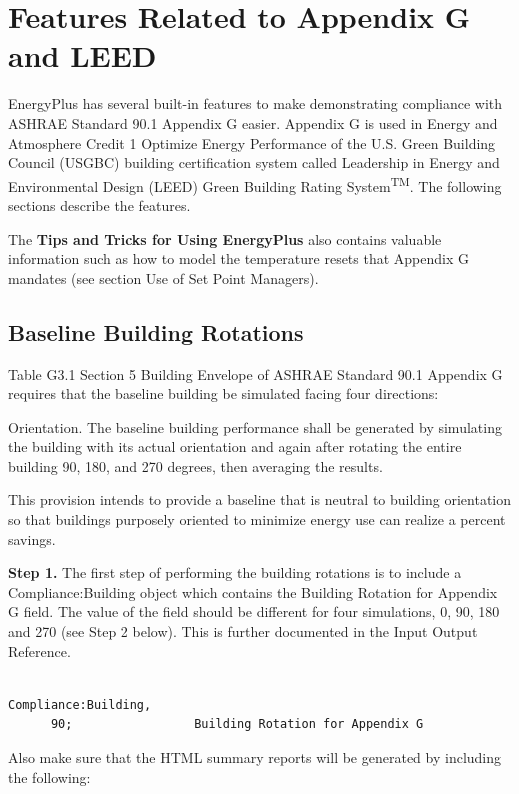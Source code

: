 \section{Features Related to Appendix G and LEED}\label{features-related-to-appendix-g-and-leed}

EnergyPlus has several built-in features to make demonstrating compliance with ASHRAE Standard 90.1 Appendix G easier. Appendix G is used in Energy and Atmosphere Credit 1 Optimize Energy Performance of the U.S. Green Building Council (USGBC) building certification system called Leadership in Energy and Environmental Design (LEED) Green Building Rating System\textsuperscript{TM}. The following sections describe the features.

The \textbf{Tips and Tricks for Using EnergyPlus} also contains valuable information such as how to model the temperature resets that Appendix G mandates (see section Use of Set Point Managers).

\subsection{Baseline Building Rotations}\label{baseline-building-rotations}

Table G3.1 Section 5 Building Envelope of ASHRAE Standard 90.1 Appendix G requires that the baseline building be simulated facing four directions:

Orientation. The baseline building performance shall be generated by simulating the building with its actual orientation and again after rotating the entire building 90, 180, and 270 degrees, then averaging the results.

This provision intends to provide a baseline that is neutral to building orientation so that buildings purposely oriented to minimize energy use can realize a percent savings.

\textbf{Step 1.} The first step of performing the building rotations is to include a Compliance:Building object which contains the Building Rotation for Appendix G field. The value of the field should be different for four simulations, 0, 90, 180 and 270 (see Step 2 below). This is further documented in the Input Output Reference.

\begin{lstlisting}

Compliance:Building,
      90;                 Building Rotation for Appendix G
\end{lstlisting}

Also make sure that the HTML summary reports will be generated by including the following:

